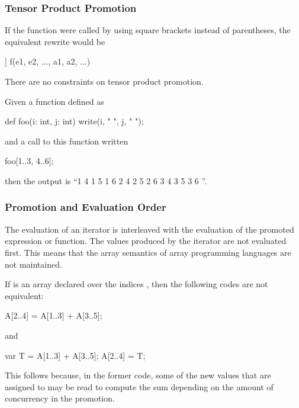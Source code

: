 \subsubsection{Tensor Product Promotion}
\label{Tensor_Product_Promotion}

If the function  were called by using square brackets instead
of parentheses, the equivalent rewrite would be
\begin{chapel}
[(e1, e2, ...) in [s1, s2, ...]] f(e1, e2, ..., a1, a2, ...)
\end{chapel}
There are no constraints on tensor product promotion.

\begin{example}
Given a function defined as
\begin{chapel}
def foo(i: int, j: int) {
  write(i, " ", j, " ");
}
\end{chapel}
and a call to this function written
\begin{chapel}
foo[1..3, 4..6];
\end{chapel}
then the output is ``1 4 1 5 1 6 2 4 2 5 2 6 3 4 3 5 3 6 ''.
\end{example}

\subsubsection{Promotion and Evaluation Order}

The evaluation of an iterator is interleaved with the evaluation of
the promoted expression or function.  The values produced by the
iterator are not evaluated first.  This means that the array semantics
of array programming languages are not maintained.

\begin{example}
If  is an array declared over the indices , then
the following codes are not equivalent:
\begin{chapel}
A[2..4] = A[1..3] + A[3..5];
\end{chapel}
and
\begin{chapel}
var T = A[1..3] + A[3..5];
A[2..4] = T;
\end{chapel}
This follows because, in the former code, some of the new values that
are assigned to  may be read to compute the sum depending on
the amount of concurrency in the promotion.
\end{example}
